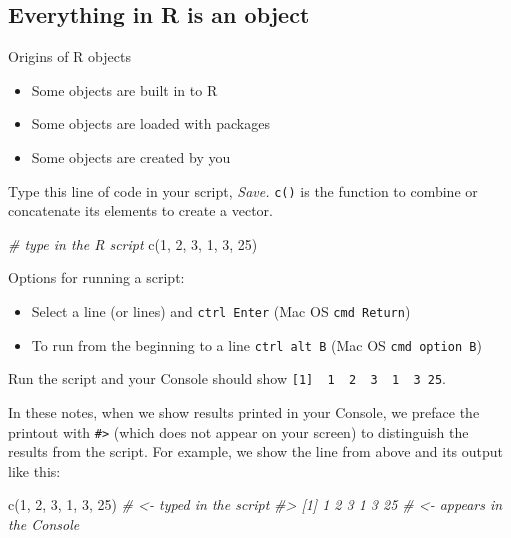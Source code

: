 \documentclass[
]{book}
\newenvironment{Shaded}{\begin{snugshade}}{\end{snugshade}}
\newcommand{\CommentTok}[1]{\textcolor[rgb]{0.56,0.35,0.01}{\textit{#1}}}
\newcommand{\DecValTok}[1]{\textcolor[rgb]{0.00,0.00,0.81}{#1}}
\newcommand{\FunctionTok}[1]{\textcolor[rgb]{0.00,0.00,0.00}{#1}}
\newcommand{\NormalTok}[1]{#1}
\providecommand{\tightlist}{%
  \setlength{\itemsep}{0pt}\setlength{\parskip}{0pt}}
\begin{document}
\hypertarget{everything-in-r-is-an-object}{%
\subsection{Everything in R is an object}\label{everything-in-r-is-an-object}}

Origins of R objects

\begin{itemize}
\tightlist
\item
  Some objects are built in to R
\item
  Some objects are loaded with packages
\item
  Some objects are created by you
\end{itemize}

Type this line of code in your script, \emph{Save.} \texttt{c()} is the function to combine or concatenate its elements to create a vector.

\begin{Shaded}
\begin{Highlighting}[]
\CommentTok{\# type in the R script}
\FunctionTok{c}\NormalTok{(}\DecValTok{1}\NormalTok{, }\DecValTok{2}\NormalTok{, }\DecValTok{3}\NormalTok{, }\DecValTok{1}\NormalTok{, }\DecValTok{3}\NormalTok{, }\DecValTok{25}\NormalTok{)}
\end{Highlighting}
\end{Shaded}

Options for running a script:

\begin{itemize}
\tightlist
\item
  Select a line (or lines) and \texttt{ctrl\ Enter} (Mac OS \texttt{cmd\ Return})
\item
  To run from the beginning to a line \texttt{ctrl\ alt\ B} (Mac OS \texttt{cmd\ option\ B})
\end{itemize}

Run the script and your Console should show \texttt{{[}1{]}\ \ 1\ \ 2\ \ 3\ \ 1\ \ 3\ 25}.

In these notes, when we show results printed in your Console, we preface the printout with \texttt{\#\textgreater{}} (which does not appear on your screen) to distinguish the results from the script. For example, we show the line from above and its output like this:

\begin{Shaded}
\begin{Highlighting}[]
\FunctionTok{c}\NormalTok{(}\DecValTok{1}\NormalTok{, }\DecValTok{2}\NormalTok{, }\DecValTok{3}\NormalTok{, }\DecValTok{1}\NormalTok{, }\DecValTok{3}\NormalTok{, }\DecValTok{25}\NormalTok{)          }\CommentTok{\# \textless{}{-} typed in the script}
\CommentTok{\#\textgreater{} [1]  1  2  3  1  3 25      \# \textless{}{-} appears in the Console}
\end{Highlighting}
\end{Shaded}
\end{document}
